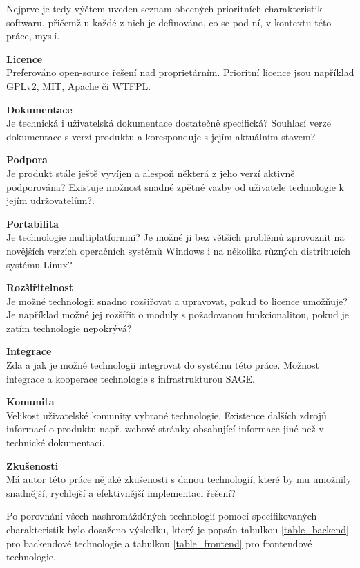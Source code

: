 \documentclass[thesis=M,czech]{FITthesis}[2012/06/26]
\begin{document}
	Nejprve je tedy výčtem uveden seznam obecných prioritních charakteristik softwaru, přičemž u každé z nich je definováno, co se pod ní, v kontextu této práce, myslí.

\begin{description}
\item \textbf{Licence\\}
Preferováno open-source řešení nad proprietárním. Prioritní licence jsou například GPLv2, MIT, Apache či WTFPL.
\item \textbf{Dokumentace\\}
Je technická i uživatelská dokumentace dostatečně specifická? Souhlasí verze dokumentace s verzí produktu a koresponduje s jejím aktuálním stavem?
\item \textbf{Podpora\\}
Je produkt stále ještě vyvíjen a alespoň některá z jeho verzí aktivně podporována? Existuje možnost snadné zpětné vazby od uživatele technologie k jejím udržovatelům?.
\item \textbf{Portabilita\\}
Je technologie multiplatformní? Je možné ji bez větších problémů zprovoznit na novějších verzích operačních systémů Windows i na několika různých distribucích systému Linux?
\item \textbf{Rozšiřitelnost\\}
Je možné technologii snadno rozšiřovat a upravovat, pokud to licence umožňuje? Je například možné jej rozšířit o moduly s požadovanou funkcionalitou, pokud je zatím technologie nepokrývá?
\item \textbf{Integrace\\}
Zda a jak je možné technologii integrovat do systému této práce. Možnost integrace a kooperace technologie s infrastrukturou SAGE.
\item \textbf{Komunita\\}
Velikost uživatelské komunity vybrané technologie. Existence dalších zdrojů informací o produktu např. webové stránky obsahující informace jiné než v technické dokumentaci.
\item \textbf{Zkušenosti\\}
Má autor této práce nějaké zkušenosti s danou technologií, které by mu umožnily snadnější, rychlejší a efektivnější implementaci řešení?
\end{description}

Po porovnání všech nashromážděných technologií pomocí specifikovaných charakteristik bylo dosaženo výsledku, který je popsán tabulkou \ref{table_backend} pro backendové technologie a tabulkou \ref{table_frontend} pro frontendové technologie.
\end{document}
